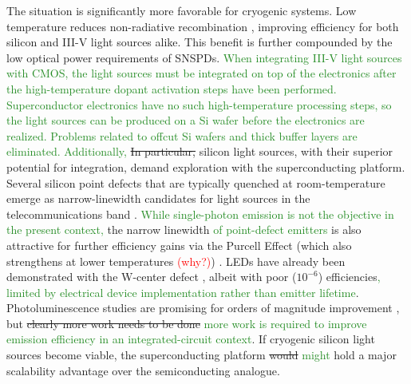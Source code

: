 \documentclass[twocolumn]{article}
\begin{document}
The situation is significantly more favorable for cryogenic systems. Low temperature reduces non-radiative recombination \cite{}, improving efficiency for both silicon and III-V light sources alike. This benefit is further compounded by the low optical power requirements of SNSPDs. \textcolor{ForestGreen}{When integrating III-V light sources with CMOS, the light sources must be integrated on top of the electronics after the high-temperature dopant activation steps have been performed. Superconductor electronics have no such high-temperature processing steps, so the light sources can be produced on a Si wafer before the electronics are realized. Problems related to offcut Si wafers and thick buffer layers are eliminated. Additionally,} \sout{In particular, }silicon light sources, with their superior potential for integration, demand exploration with the superconducting platform. Several silicon point defects that are typically quenched at room-temperature emerge as narrow-linewidth candidates for light sources in the telecommunications band \cite{davies1989optical,suku2014,buckley2017all,bere2018,chbe2018}. \textcolor{ForestGreen}{While single-photon emission \cite{hobe2020,redu2020,bech2020} is not the objective in the present context,} the narrow linewidth \textcolor{ForestGreen}{of point-defect emitters} is also attractive for further efficiency gains via the Purcell Effect (which also strengthens at lower temperatures \textcolor{red}{(why?)}) \cite{romeira2018purcell}. LEDs have already been demonstrated with the W-center defect \cite{buckley2017all,bao2007point}, albeit with poor ($10^{-6}$) efficiencies\textcolor{ForestGreen}{, limited by electrical device implementation rather than emitter lifetime}. Photoluminescence studies are promising for orders of magnitude improvement \cite{buckley2020optimization}, but \sout{clearly more work needs to be done} \textcolor{ForestGreen}{more work is required to improve emission efficiency in an integrated-circuit context}. If cryogenic silicon light sources become viable, the superconducting platform \sout{would} \textcolor{ForestGreen}{might} hold a major scalability advantage over the semiconducting analogue. 
\end{document}
